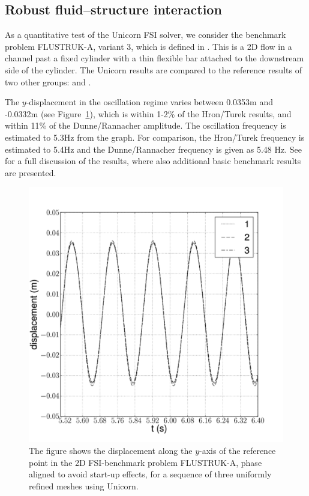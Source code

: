 \subsection{Robust fluid--structure interaction}

As a quantitative test of the Unicorn FSI solver, we consider
the benchmark problem FLUSTRUK-A, variant 3, which is defined in
\citet{HronTurek2005}. This is a 2D flow in a channel past a fixed
cylinder with a thin flexible bar attached to the downstream side of the
cylinder. The Unicorn results are compared to the reference results of
two other groups: \citet{HronTurek2005} and \citet{DunneRannacher2006}.

The $y$-displacement in the oscillation regime varies between 0.0353m
and -0.0332m (see Figure~\ref{hoffman-1:fig:flustruk}), which is within 1-2\% of
the Hron/Turek results, and within 11\% of the Dunne/Rannacher
amplitude. The oscillation frequency is estimated to 5.3Hz from the
graph. For comparison, the Hron/Turek frequency is estimated to 5.4Hz
and the Dunne/Rannacher frequency is given as 5.48 Hz. See
\citet{HoffmanJanssonStockli2011} for a full discussion of the
results, where also additional basic benchmark results are presented.

\begin{figure}
  \center
  \includegraphics[width=\largefig]{chapters/hoffman-1/png/fsi_bench3D_displacement_aligned.pdf}
  \caption{The figure shows the displacement along the $y$-axis of the
    reference point in the 2D FSI-benchmark problem FLUSTRUK-A, phase
    aligned to avoid start-up effects, for a sequence of three
    uniformly refined meshes using Unicorn.}
  \label{hoffman-1:fig:flustruk}
\end{figure}

